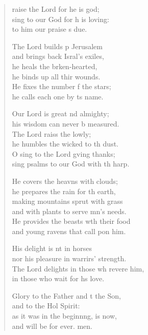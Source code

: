 \begin{verse}
  \begin{patverse}
raise the Lord for he is god;\Flex\\
sing to our God for h is loving:\Med\\
to him our praise \pointup{\i}s due.

The Lord builds p Jerusalem\Med\\
and brings back Isral’s exiles,\\
he heals the brken-hearted,\Med\\
he binds up all thir wounds.\\
He fixes the number f the stars;\Med\\
he calls each one by \pointup{\i}ts name.

Our Lord is great nd almighty;\Med\\
his wisdom can never b measured.\\
The Lord raiss the lowly;\Med\\
he humbles the wicked to th dust.\\
O sing to the Lord g\pointup{\i}ving thanks;\Med\\
sing psalms to our God with th harp.

He covers the heavns with clouds;\Med\\
he prepares the rain for th earth,\\
making mountains sprut with grass\Med\\
and with plants to serve mn’s needs.\\
He provides the beasts w\pointup{\i}th their food\Med\\
and young ravens that call pon him.

His delight is nt in horses\Med\\
nor his pleasure in warrirs’ strength.\\
The Lord delights in those wh revere him,\Med\\
in those who wait for h\pointup{\i}s love.

Glory to the Father and t the Son,\Med\\
and to the Hol Spirit:\\
as it was in the beginn\pointup{\i}ng, is now,\Med\\
and will be for ever. men.
  \end{patverse}
  \end{verse}
